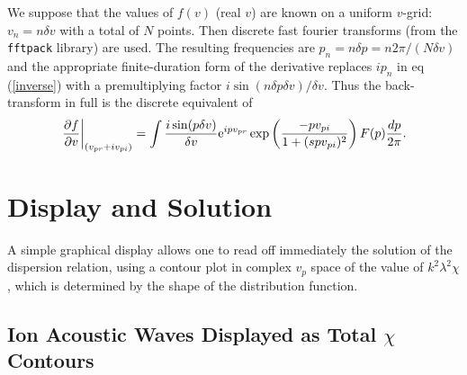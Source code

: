 \documentclass[12pt]{article}
\begin{document}
We suppose that the values of $f(v)$ (real $v$) are known on a uniform
$v$-grid: $v_n = n \delta v$ with a total of $N$ points. Then discrete
fast fourier transforms (from the \texttt{fftpack} library) are
used. The resulting frequencies are
$p_n= n \delta p = n 2\pi/(N \delta v)$ and the appropriate
finite-duration form of the derivative replaces $ip_n$ in eq
(\ref{inverse}) with a premultiplying factor
$i\sin(n \delta p \delta v)/\delta v$.
Thus the back-transform in full is the discrete equivalent of
\begin{equation}
  \label{eq:backtrans}
    \left.\partial f\over\partial v\right|_{(v_{pr}+iv_{pi})}
    =\int {i\sin(p\delta v)\over\delta v}  
    {\rm e}^{ipv_{pr}} \exp\left(-p v_{pi}\over 1+(spv_{pi})^2\right) 
    F(p) {dp\over 2\pi}.
\end{equation}


\section{Display and Solution}

A simple graphical display allows one to read off immediately the
solution of the dispersion relation, using a contour plot in complex
$v_p$ space of the value of $k^2\lambda^2\chi$, which is determined by
the shape of the distribution function.

\subsection{Ion Acoustic Waves Displayed as Total $\chi$ Contours}
\end{document}
